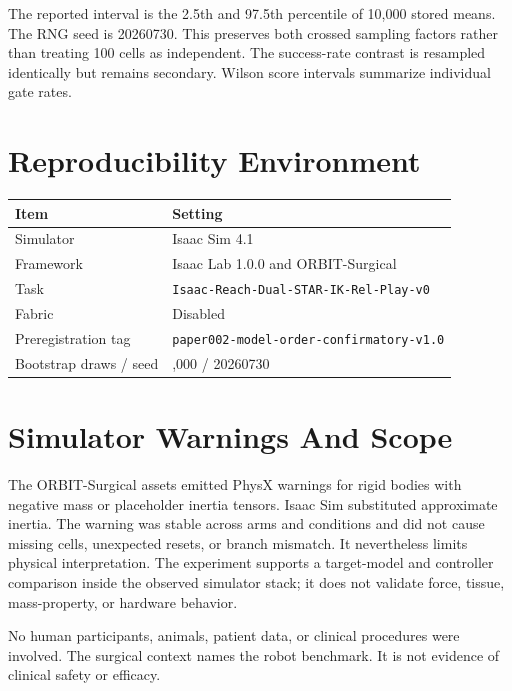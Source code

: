 \documentclass[10pt]{article}
\begin{document}
The reported interval is the 2.5th and 97.5th percentile of 10,000 stored means. The RNG seed is 20260730. This preserves both crossed sampling factors rather than treating 100 cells as independent. The success-rate contrast is resampled identically but remains secondary. Wilson score intervals summarize individual gate rates.

\section{Reproducibility Environment}

\begin{table}[htbp]
\centering
\small
\begin{tabularx}{\textwidth}{@{}>{\raggedright\arraybackslash}X >{\raggedright\arraybackslash}X@{}}
\toprule
Item & Setting \\
\midrule
Simulator & Isaac Sim 4.1 \\
Framework & Isaac Lab 1.0.0 and ORBIT-Surgical \\
Task & \nolinkurl{Isaac-Reach-Dual-STAR-IK-Rel-Play-v0} \\
Fabric & Disabled \\
Preregistration tag & \nolinkurl{paper002-model-order-confirmatory-v1.0} \\
Bootstrap draws / seed & 10,000 / 20260730 \\
\bottomrule
\end{tabularx}
\end{table}

\section{Simulator Warnings And Scope}

The ORBIT-Surgical assets emitted PhysX warnings for rigid bodies with negative mass or placeholder inertia tensors. Isaac Sim substituted approximate inertia. The warning was stable across arms and conditions and did not cause missing cells, unexpected resets, or branch mismatch. It nevertheless limits physical interpretation. The experiment supports a target-model and controller comparison inside the observed simulator stack; it does not validate force, tissue, mass-property, or hardware behavior.

No human participants, animals, patient data, or clinical procedures were involved. The surgical context names the robot benchmark. It is not evidence of clinical safety or efficacy.
\end{document}
